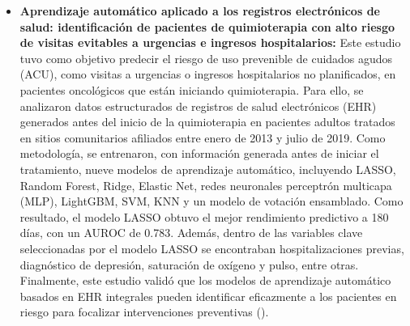 \begin{itemize}
\item \textbf{Aprendizaje automático aplicado a los registros electrónicos de salud: identificación de pacientes de quimioterapia con alto riesgo de visitas evitables a urgencias e ingresos hospitalarios:} Este estudio tuvo como objetivo predecir el riesgo de uso prevenible de cuidados agudos (ACU), como visitas a urgencias o ingresos hospitalarios no planificados, en pacientes oncológicos que están iniciando quimioterapia. Para ello, se analizaron datos estructurados de registros de salud electrónicos (EHR) generados antes del inicio de la quimioterapia en pacientes adultos tratados en sitios comunitarios afiliados entre enero de 2013 y julio de 2019. Como metodología, se entrenaron, con información generada antes de iniciar el tratamiento, nueve modelos de aprendizaje automático, incluyendo LASSO, Random Forest, Ridge, Elastic Net, redes neuronales perceptrón multicapa (MLP), LightGBM, SVM, KNN y un modelo de votación ensamblado. Como resultado, el modelo LASSO obtuvo el mejor rendimiento predictivo a 180 días, con un AUROC de 0.783. Además, dentro de las variables clave seleccionadas por el modelo LASSO se encontraban hospitalizaciones previas, diagnóstico de depresión, saturación de oxígeno y pulso, entre otras. Finalmente, este estudio validó que los modelos de aprendizaje automático basados en EHR integrales pueden identificar eficazmente a los pacientes en riesgo para focalizar intervenciones preventivas (\cite{article8}).

\end{itemize}
